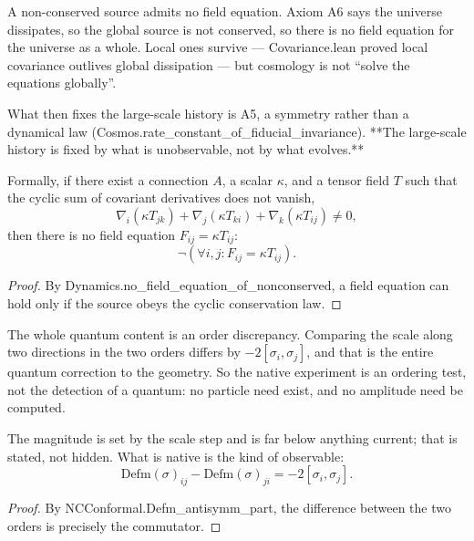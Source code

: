 \begin{theorem}
A non-conserved source admits no field equation.  Axiom A6 says the universe dissipates, so the global source is not conserved, so there is no field equation for the universe as a whole.  Local ones survive — Covariance.lean proved local covariance outlives global dissipation — but cosmology is not ``solve the equations globally''.

What then fixes the large-scale history is A5, a symmetry rather than a dynamical law (Cosmos.rate\_constant\_of\_fiducial\_invariance).  **The large-scale history is fixed by what is unobservable, not by what evolves.**

Formally, if there exist a connection $A$, a scalar $\kappa$, and a tensor field $T$ such that the cyclic sum of covariant derivatives does not vanish,
\begin{equation}
\nabla_i (\kappa T_{jk}) + \nabla_j (\kappa T_{ki}) + \nabla_k (\kappa T_{ij}) \neq 0,
\end{equation}
then there is no field equation $F_{ij} = \kappa T_{ij}$:
\begin{equation}
\neg \left(\forall i, j : F_{ij} = \kappa T_{ij}\right).
\end{equation}
\begin{proof}
By Dynamics.no\_field\_equation\_of\_nonconserved, a field equation can hold only if the source obeys the cyclic conservation law.
\end{proof}
\end{theorem}

\begin{theorem}
The whole quantum content is an order discrepancy.  Comparing the scale along two directions in the two orders differs by $-2[\sigma_i, \sigma_j]$, and that is the entire quantum correction to the geometry.  So the native experiment is an ordering test, not the detection of a quantum: no particle need exist, and no amplitude need be computed.

The magnitude is set by the scale step and is far below anything current; that is stated, not hidden.  What is native is the kind of observable:
\begin{equation}
\text{Defm}(\sigma)_{ij} - \text{Defm}(\sigma)_{ji} = -2 [\sigma_i, \sigma_j].
\end{equation}
\begin{proof}
By NCConformal.Defm\_antisymm\_part, the difference between the two orders is precisely the commutator.
\end{proof}
\end{theorem}


